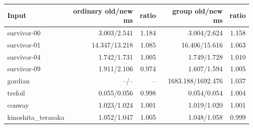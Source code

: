 \begin{center}
\begin{tabular}{@{}lrrrr@{}}
\toprule
Input & ordinary old/new ms & ratio & group old/new ms & ratio \\
\midrule
survivor-00 & 3.003/2.541 & 1.184 & 3.004/2.624 & 1.158 \\
survivor-01 & 14.347/13.218 & 1.085 & 16.406/15.616 & 1.063 \\
survivor-04 & 1.742/1.731 & 1.005 & 1.749/1.728 & 1.010 \\
survivor-09 & 1.911/2.106 & 0.974 & 1.607/1.594 & 1.005 \\
gordian & --/-- & -- & 1683.188/1692.476 & 1.037 \\
trefoil & 0.055/0.056 & 0.998 & 0.054/0.054 & 1.004 \\
conway & 1.023/1.024 & 1.001 & 1.019/1.020 & 1.001 \\
kinoshita\_terasaka & 1.052/1.047 & 1.005 & 1.048/1.058 & 0.999 \\
\bottomrule
\end{tabular}
\end{center}
